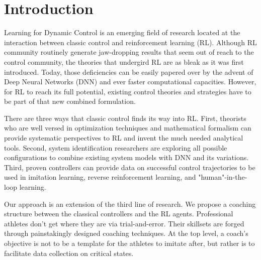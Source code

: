 \documentclass{IJCAS}
\begin{document}

\section{Introduction}
Learning for Dynamic Control is an emerging field of research located at the interaction between classic control and reinforcement learning (RL). Although RL community routinely generate jaw-dropping results that seem out of reach to the control community\cite{Andrychowicz2020LearningDI}\cite{Kalashnikov2018QTOptSD}\cite{Lee2020LearningQL}, the theories that undergird RL are as bleak as it was first introduced\cite{Bertsekas1996NeuroDynamicP}. Today, those deficiencies can be easily papered over by the advent of Deep Neural Networks (DNN) and ever faster computational capacities. However, for RL to reach its full potential, existing control theories and strategies have to be part of that new combined formulation.

There are three ways that classic control finds its way into RL. First, theorists who are well versed in optimization techniques and mathematical formalism can provide systematic perspectives to RL and invent the much needed analytical tools\cite{Han2020ActorCriticRL}\cite{Weinan2017APO}\cite{Dupont2019AugmentedNO}\cite{Betancourt2018OnSO}\cite{Nachum2020ReinforcementLV}. Second, system identification researchers are exploring all possible configurations to combine existing system models with DNN and its variations\cite{Hewing2020LearningBasedMP}\cite{Mohan2020EmbeddingHP}\cite{Lusch2018DeepLF}\cite{Bai2019DeepEM}\cite{BelbutePeres2020CombiningDP}. Third, proven controllers can provide data on successful control trajectories to be used in imitation learning, reverse reinforcement learning, and "human"-in-the-loop learning\cite{Knox2009InteractivelySA}\cite{Knox2010CombiningMF}\cite{Peng2018DeepMimicED}\cite{Peng2020LearningAR}\cite{Paine2018OneShotHI}.

Our approach is an extension of the third line of research. We propose a coaching structure between the classical controllers and the RL agents. Professional athletes don't get where they are via trial-and-error. Their skillsets are forged through painstakingly designed coaching techniques. At the top level, a coach's objective is not to be a template for the athletes to imitate after, but rather is to facilitate data collection on critical states. 
\end{document}
